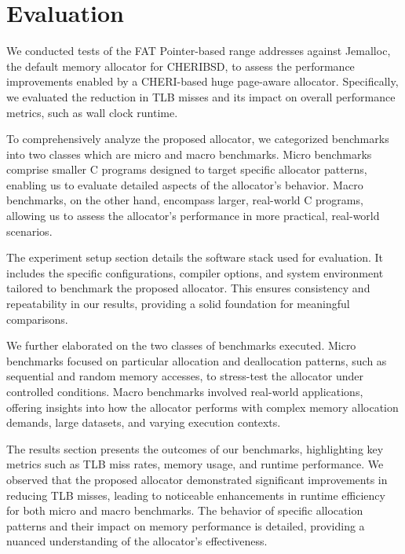 \documentclass[11pt]{article}
\author{Akilan}
\date{\today}
\title{}
\begin{document}
\tableofcontents

\section{Evaluation}
\label{sec:org3be955b}

We conducted tests of the FAT Pointer-based range addresses against Jemalloc\cite{jemalloc}, 
the default memory allocator for CHERIBSD\cite{cheribsd}, to assess the performance improvements 
enabled by a CHERI-based huge page-aware allocator. Specifically, we evaluated 
the reduction in TLB misses and its impact on overall 
performance metrics, such as wall clock runtime.

To comprehensively analyze the proposed allocator, we categorized benchmarks into 
two classes which are micro and macro benchmarks. Micro benchmarks comprise smaller 
C programs designed to target specific allocator patterns, enabling us to evaluate 
detailed aspects of the allocator's behavior. Macro benchmarks, on the other hand, 
encompass larger, real-world C programs, allowing us to assess the allocator's 
performance in more practical, real-world scenarios.

The experiment setup section details the software stack used for evaluation. It includes 
the specific configurations, compiler options, and system environment tailored 
to benchmark the proposed allocator. This ensures consistency and repeatability 
in our results, providing a solid foundation for meaningful comparisons.

We further elaborated on the two classes of benchmarks executed. Micro benchmarks 
focused on particular allocation and deallocation patterns, such as sequential and 
random memory accesses, to stress-test the allocator under controlled conditions. 
Macro benchmarks involved real-world applications, offering insights into how 
the allocator performs with complex memory allocation demands, large datasets, 
and varying execution contexts.

The results section presents the outcomes of our benchmarks, highlighting key metrics 
such as TLB miss rates, memory usage, and runtime performance. We observed that the 
proposed allocator demonstrated significant improvements in reducing TLB misses, 
leading to noticeable enhancements in runtime efficiency for both micro and macro 
benchmarks. The behavior of specific allocation patterns and their impact on memory 
performance is detailed, providing a nuanced understanding of the allocator's effectiveness.
\end{document}
